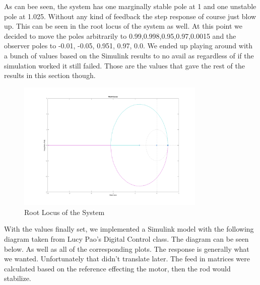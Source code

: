 \documentclass[12pt]{extarticle}
\newenvironment{sect}
  {\adjustwidth{-2.25em}{0pt}}
  {\endadjustwidth}
\begin{document}
\begin{sect}
As can bee seen, the system has one marginally stable pole at 1 and one unstable pole at 1.025. Without any kind of feedback the step response of course just blow up. This can be seen in the root locus of the system as well. At this point we decided to move the poles arbitrarily to 0.99,0.998,0.95,0.97,0.0015 and the observer poles to -0.01, -0.05, 0.951, 0.97, 0.0. We ended up playing around with a bunch of values based on the Simulink results to no avail as regardless of if the simulation worked it still failed. Those are the values that gave the rest of the results in this section though.
\begin{figure}[H]
    \centering
    \includegraphics[width=0.8\textwidth]{Images/rlocus.png}
    \caption{Root Locus of the System}
\end{figure}
With the values finally set, we implemented a Simulink model with the following diagram taken from Lucy Pao's Digital Control class. The diagram can be seen below. As well as all of the corresponding plots. The response is generally what we wanted. Unfortunately that didn't translate later. The feed in matrices were calculated based on the reference effecting the motor, then the rod would stabilize.


\end{sect}
\end{document}
